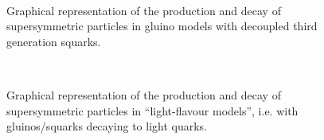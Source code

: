 \begin{figure}[h!]
  \begin{center}
     ~~
     ~~
    \caption{
      Graphical representation of the production and decay of supersymmetric particles 
      in gluino models with decoupled third generation squarks. 
    }
    \label{fig:simplified-models-feyn-gluino}
  \end{center}
\end{figure}

\begin{figure}[h!]
  \begin{center}
     ~~
    \caption{
      Graphical representation of the production and decay of supersymmetric particles 
      in ``light-flavour models'', i.e. with gluinos/squarks decaying to light quarks. 
    }
    \label{fig:simplified-models-feyn-light}
  \end{center}
\end{figure}

